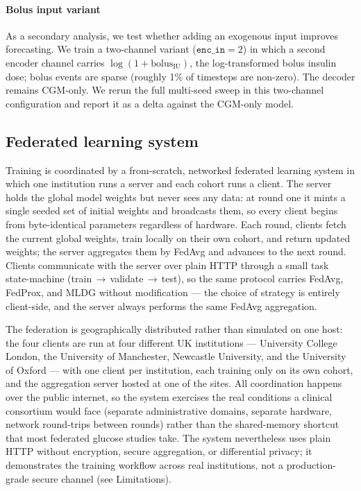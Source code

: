 \documentclass[10pt,letterpaper]{article}
\begin{document}
\paragraph{Bolus input variant}
As a secondary analysis, we test whether adding an exogenous input improves
forecasting. We train a two-channel variant ($\texttt{enc\_in}=2$) in which a
second encoder channel carries $\log(1+\mathrm{bolus}_{\mathrm{IU}})$, the
log-transformed bolus insulin dose; bolus events are sparse (roughly 1\% of
timesteps are non-zero). The decoder remains CGM-only. We rerun the full
multi-seed sweep in this two-channel configuration and report it as a delta
against the CGM-only model.

\subsection*{Federated learning system}

Training is coordinated by a from-scratch, networked federated learning system
in which one institution runs a server and each cohort runs a client. The server
holds the global model weights but never sees any data: at round one it mints a
single seeded set of initial weights and broadcasts them, so every client begins
from byte-identical parameters regardless of hardware. Each round, clients fetch
the current global weights, train locally on their own cohort, and return updated
weights; the server aggregates them by FedAvg and advances to the next round.
Clients communicate with the server over plain HTTP through a small task
state-machine (train\,$\rightarrow$\,validate\,$\rightarrow$\,test), so the same
protocol carries FedAvg, FedProx, and MLDG without modification --- the choice of
strategy is entirely client-side, and the server always performs the same FedAvg
aggregation.

The federation is geographically distributed rather than simulated on one host:
the four clients are run at four different UK institutions --- University College
London, the University of Manchester, Newcastle University, and the University of
Oxford --- with one client per institution, each training only on its own cohort,
and the aggregation server hosted at one of the sites. All coordination happens
over the public internet, so the system exercises the real conditions a clinical
consortium would face (separate administrative domains, separate hardware,
network round-trips between rounds) rather than the shared-memory shortcut that
most federated glucose studies take. The system nevertheless uses plain HTTP
without encryption, secure aggregation, or differential privacy; it demonstrates
the training workflow across real institutions, not a production-grade secure
channel (see Limitations).
\end{document}
